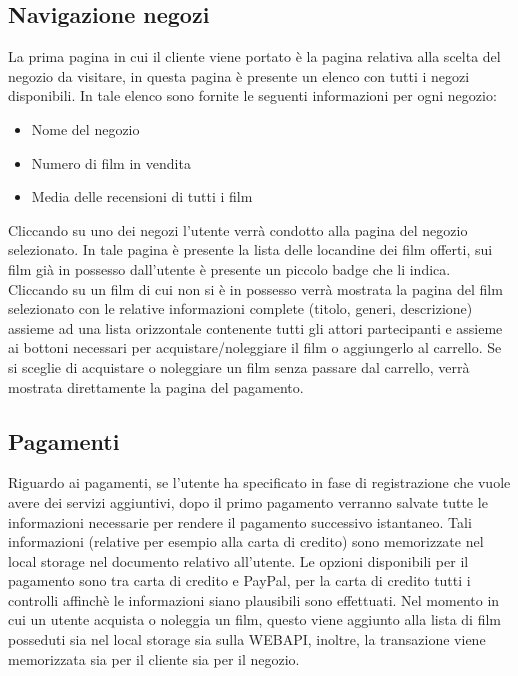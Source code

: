 \documentclass{article}
\begin{document}
    \subsection{Navigazione negozi}
    La prima pagina in cui il cliente viene portato è la pagina relativa alla scelta del negozio da visitare, 
    in questa pagina è presente un elenco con tutti i negozi disponibili.
    In tale elenco sono fornite le seguenti informazioni per ogni negozio:
    \begin{itemize}
        \item Nome del negozio
        \item Numero di film in vendita
        \item Media delle recensioni di tutti i film
    \end{itemize}
    Cliccando su uno dei negozi l'utente verrà condotto alla pagina del negozio selezionato.
    In tale pagina è presente la lista delle locandine dei film offerti, sui film già in possesso dall'utente è presente
    un piccolo badge che li indica.
    Cliccando su un film di cui non si è in possesso verrà mostrata la pagina del film selezionato con le relative informazioni complete (titolo, generi, descrizione)
    assieme ad una lista orizzontale contenente tutti gli attori partecipanti e assieme ai bottoni necessari per acquistare/noleggiare il film o aggiungerlo al carrello.
    Se si sceglie di acquistare o noleggiare un film senza passare dal carrello, verrà mostrata direttamente la pagina del pagamento.

    \subsection{Pagamenti}
    Riguardo ai pagamenti, se l'utente ha specificato in fase di registrazione che vuole avere dei servizi aggiuntivi,
    dopo il primo pagamento verranno salvate tutte le informazioni necessarie per rendere il pagamento successivo istantaneo.
    Tali informazioni (relative per esempio alla carta di credito) sono memorizzate nel local storage nel documento relativo all'utente.
    Le opzioni disponibili per il pagamento sono tra carta di credito e PayPal\textregistered, per la carta di credito tutti i controlli affinchè le
    informazioni siano plausibili sono effettuati.
    Nel momento in cui un utente acquista o noleggia un film, questo viene aggiunto alla lista di film posseduti sia nel local storage sia sulla WEBAPI,
    inoltre, la transazione viene memorizzata sia per il cliente sia per il negozio.
\end{document}

